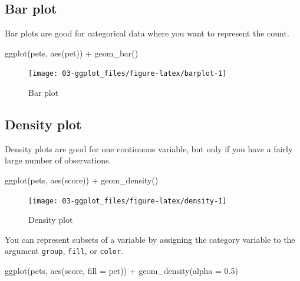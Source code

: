 \documentclass[
  oneside]{book}
\newenvironment{Shaded}{\begin{snugshade}}{\end{snugshade}}
\newcommand{\AttributeTok}[1]{\textcolor[rgb]{0.77,0.63,0.00}{#1}}
\newcommand{\FloatTok}[1]{\textcolor[rgb]{0.00,0.00,0.81}{#1}}
\newcommand{\FunctionTok}[1]{\textcolor[rgb]{0.00,0.00,0.00}{#1}}
\newcommand{\NormalTok}[1]{#1}
\newcommand{\SpecialCharTok}[1]{\textcolor[rgb]{0.00,0.00,0.00}{#1}}
\begin{document}
\hypertarget{geom_bar}{%
\subsection{Bar plot}\label{geom_bar}}

Bar plots are good for categorical data where you want to represent the count.

\begin{Shaded}
\begin{Highlighting}[]
\FunctionTok{ggplot}\NormalTok{(pets, }\FunctionTok{aes}\NormalTok{(pet)) }\SpecialCharTok{+}
  \FunctionTok{geom\_bar}\NormalTok{()}
\end{Highlighting}
\end{Shaded}

\begin{figure}

{\centering \texttt{[image: 03-ggplot\_files/figure-latex/barplot-1]} 

}

\caption{Bar plot}\label{fig:barplot}
\end{figure}

\hypertarget{geom_density}{%
\subsection{Density plot}\label{geom_density}}

Density plots are good for one continuous variable, but only if you have a fairly large number of observations.

\begin{Shaded}
\begin{Highlighting}[]
\FunctionTok{ggplot}\NormalTok{(pets, }\FunctionTok{aes}\NormalTok{(score)) }\SpecialCharTok{+}
  \FunctionTok{geom\_density}\NormalTok{()}
\end{Highlighting}
\end{Shaded}

\begin{figure}

{\centering \texttt{[image: 03-ggplot\_files/figure-latex/density-1]} 

}

\caption{Density plot}\label{fig:density}
\end{figure}

You can represent subsets of a variable by assigning the category variable to the argument \texttt{group}, \texttt{fill}, or \texttt{color}.

\begin{Shaded}
\begin{Highlighting}[]
\FunctionTok{ggplot}\NormalTok{(pets, }\FunctionTok{aes}\NormalTok{(score, }\AttributeTok{fill =}\NormalTok{ pet)) }\SpecialCharTok{+}
  \FunctionTok{geom\_density}\NormalTok{(}\AttributeTok{alpha =} \FloatTok{0.5}\NormalTok{)}
\end{Highlighting}
\end{Shaded}
\end{document}
